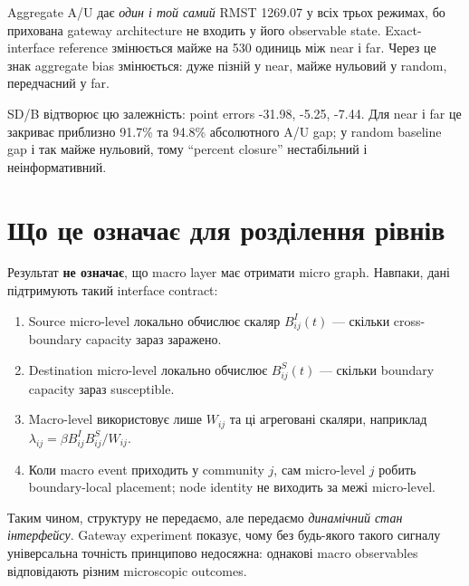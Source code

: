 \documentclass[11pt,a4paper]{article}
\begin{document}
Aggregate A/U дає \emph{один і той самий} RMST 1269.07 у всіх трьох режимах, бо прихована gateway architecture не входить у його observable state. Exact-interface reference змінюється майже на 530 одиниць між near і far. Через це знак aggregate bias змінюється: дуже пізній у near, майже нульовий у random, передчасний у far.

SD/B відтворює цю залежність: point errors -31.98, -5.25, -7.44. Для near і far це закриває приблизно 91.7\% та 94.8\% абсолютного A/U gap; у random baseline gap і так майже нульовий, тому ``percent closure'' нестабільний і неінформативний.

\section{Що це означає для розділення рівнів}
Результат \textbf{не означає}, що macro layer має отримати micro graph. Навпаки, дані підтримують такий interface contract:
\begin{enumerate}
\item Source micro-level локально обчислює скаляр $B^I_{ij}(t)$ --- скільки cross-boundary capacity зараз заражено.
\item Destination micro-level локально обчислює $B^S_{ij}(t)$ --- скільки boundary capacity зараз susceptible.
\item Macro-level використовує лише $W_{ij}$ та ці агреговані скаляри, наприклад $\lambda_{ij}=\beta B^I_{ij}B^S_{ij}/W_{ij}$.
\item Коли macro event приходить у community $j$, сам micro-level $j$ робить boundary-local placement; node identity не виходить за межі micro-level.
\end{enumerate}
Таким чином, структуру не передаємо, але передаємо \emph{динамічний стан інтерфейсу}. Gateway experiment показує, чому без будь-якого такого сигналу універсальна точність принципово недосяжна: однакові macro observables відповідають різним microscopic outcomes.
\end{document}
